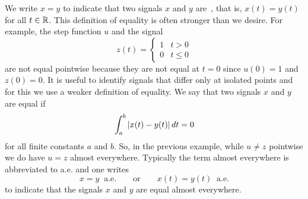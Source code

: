
We write $x = y$ to indicate that two signals $x$ and $y$ are~, that is, $x(t) = y(t)$ for all $t \in {\mathbb R}$.  This definition of equality is often stronger than we desire.  For example, the step function $u$ and the signal
\[
z(t) = \begin{cases}
1 & t > 0 \\
0 & t \leq 0
\end{cases}
\]
are not equal pointwise because they are not equal at $t=0$ since $u(0) = 1$ and $z(0) = 0$. %
It is useful to identify signals that differ only at isolated points and for this we use a weaker definition of equality.  We say that two signals $x$ and $y$ are equal  if
\[
\int_{a}^b \left\vert  x(t) - y(t)  \right\vert dt = 0
\]
for all finite constants $a$ and $b$.  So, in the previous example, while $u \neq z$ pointwise we do have $u = z$ almost everywhere.  Typically the term almost everywhere is abbreviated to a.e. and one writes 
\[
x = y \;\; \text{a.e.} \qquad \text{or} \qquad x(t) = y(t) \;\; \text{a.e.}
\] 
to indicate that the signals $x$ and $y$ are equal almost everywhere.  %



